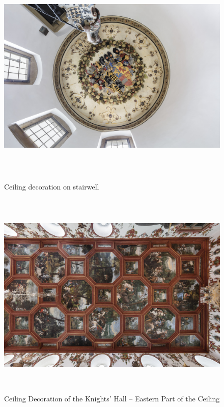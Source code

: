 \documentclass[
  a4paper,
]{book}
\begin{document}
\begin{figure}
\includegraphics[height=10cm]{images/fmd10005854a.jpg}

\caption{Ceiling decoration on stairwell}
\label{fig:{images/fmd10005854a.jpg}}

\clearpage

\centering

\includegraphics[height=10cm]{images/fmd10005870a.jpg}

\caption{Ceiling Decoration of the Knights' Hall – Eastern Part of the Ceiling}
\label{fig:{images/fmd10005870a.jpg}}

\clearpage

\centering


\end{figure}
\end{document}
